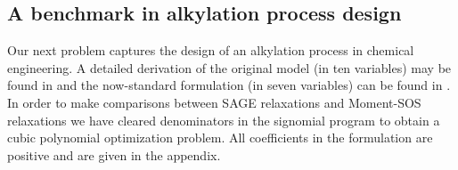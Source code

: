 
\subsection{A benchmark in alkylation process design}

Our next problem captures the design of an alkylation process in chemical engineering.
A detailed derivation of the original model (in ten variables) may be found in \cite{bracken1968selected} and the now-standard formulation (in seven variables) can be found in \cite[7.2.1]{Floudas1999}.
In order to make comparisons between SAGE relaxations and Moment-SOS relaxations we have cleared denominators in the signomial program \cite[7.2.1]{Floudas1999} to obtain a cubic polynomial optimization problem.
All coefficients in the formulation are positive and are given in the appendix.

